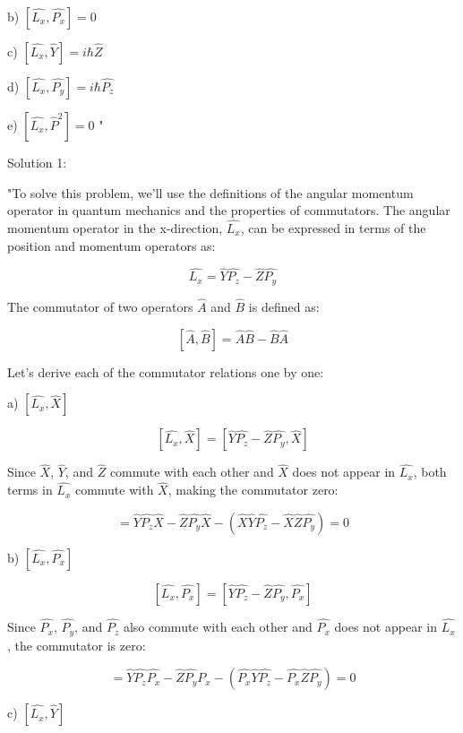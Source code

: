 b) \( \left[ \hat{L_{x}}, \hat{P_{x}} \right] = 0 \)

c) \( \left[ \hat{L_{x}}, \hat{Y} \right] = i \hbar \hat{Z} \)

d) \( \left[ \hat{L_{x}}, \hat{P_{y}} \right] = i \hbar \hat{P_{z}} \)

e) \( \left[ \hat{L_{x}}, \hat{P}^{2} \right] = 0 \) "

Solution 1: 

"To solve this problem, we'll use the definitions of the angular momentum operator in quantum mechanics and the properties of commutators. The angular momentum operator in the x-direction, \( \hat{L_{x}} \), can be expressed in terms of the position and momentum operators as:

\[ \hat{L_{x}} = \hat{Y}\hat{P_{z}} - \hat{Z}\hat{P_{y}} \]

The commutator of two operators \( \hat{A} \) and \( \hat{B} \) is defined as:

\[ \left[ \hat{A}, \hat{B} \right] = \hat{A}\hat{B} - \hat{B}\hat{A} \]

Let's derive each of the commutator relations one by one:

a) \( \left[ \hat{L_{x}}, \hat{X} \right] \)

\[ \left[ \hat{L_{x}}, \hat{X} \right] = \left[ \hat{Y}\hat{P_{z}} - \hat{Z}\hat{P_{y}}, \hat{X} \right] \]

Since \( \hat{X} \), \( \hat{Y} \), and \( \hat{Z} \) commute with each other and \( \hat{X} \) does not appear in \( \hat{L_{x}} \), both terms in \( \hat{L_{x}} \) commute with \( \hat{X} \), making the commutator zero:

\[ = \hat{Y}\hat{P_{z}}\hat{X} - \hat{Z}\hat{P_{y}}\hat{X} - (\hat{X}\hat{Y}\hat{P_{z}} - \hat{X}\hat{Z}\hat{P_{y}}) = 0 \]

b) \( \left[ \hat{L_{x}}, \hat{P_{x}} \right] \)

\[ \left[ \hat{L_{x}}, \hat{P_{x}} \right] = \left[ \hat{Y}\hat{P_{z}} - \hat{Z}\hat{P_{y}}, \hat{P_{x}} \right] \]

Since \( \hat{P_{x}} \), \( \hat{P_{y}} \), and \( \hat{P_{z}} \) also commute with each other and \( \hat{P_{x}} \) does not appear in \( \hat{L_{x}} \), the commutator is zero:

\[ = \hat{Y}\hat{P_{z}}\hat{P_{x}} - \hat{Z}\hat{P_{y}}\hat{P_{x}} - (\hat{P_{x}}\hat{Y}\hat{P_{z}} - \hat{P_{x}}\hat{Z}\hat{P_{y}}) = 0 \]

c) \( \left[ \hat{L_{x}}, \hat{Y} \right] \)

